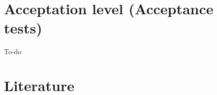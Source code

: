 \documentclass[signature]{deltares_manual}
\begin{document}
\chapter{Acceptation level (Acceptance tests)}
\label{acceptanceTest}
To-do

\chapter{Literature}  \label{chapterLiterature}



\pagestyle{empty}
\mbox{}

\end{document}
